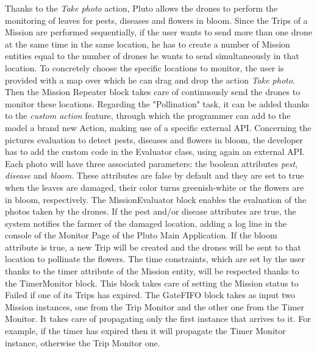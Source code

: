 Thanks to the \textit{Take photo} action, Pluto allows the drones to perform the monitoring of leaves for pests, diseases and flowers in bloom.
Since the Trips of a Mission are performed sequentially, if the user wants to send more than one drone at the same time in the same location, he has to create a number of Mission entities equal to the number of  drones he wants to send simultaneously in that location.
To concretely choose the specific locations to monitor, the user is provided with a map over which he can drag and drop the action \textit{Take photo}.
Then the Mission Repeater block takes care of continuously send the drones to monitor these locations.
Regarding the "Pollination" task, it can be added thanks to the \textit{custom action} feature, through which the programmer can add to the model a brand new Action, making use of a specific external API.
Concerning the pictures evaluation to detect pests, diseases and flowers in bloom, the developer has to add the custom code in the Evaluator class, using again an external API. 
Each photo will have three associated parameters: the boolean attributes \textit{pest}, \textit{disease} and \textit{bloom}.
These attributes are false by default and they are set to true when the leaves are damaged, their color turns greenish-white or the flowers are in bloom, respectively. 
The MissionEvaluator block enables the evaluation of the photos taken by the drones. If the pest and/or disease attributes are true, the system notifies the farmer of the damaged location, adding a log line in the console of the Monitor Page of the Pluto Main Application.
If the bloom attribute is true, a new Trip will be created and the drones will be sent to that location to pollinate the flowers.
The time constraints, which are set by the user thanks to the timer attribute of the Mission entity, will be respected thanks to the TimerMonitor block.
This block takes care of setting the Mission status to Failed if one of its Trips has expired.
The GateFIFO block takes as input two Mission instances, one from the Trip Monitor and the other one from the Timer Monitor.
It takes care of propagating only the first instance that arrives to it.
For example, if the timer has expired then it will propagate the Timer Monitor instance, otherwise the Trip Monitor one.

